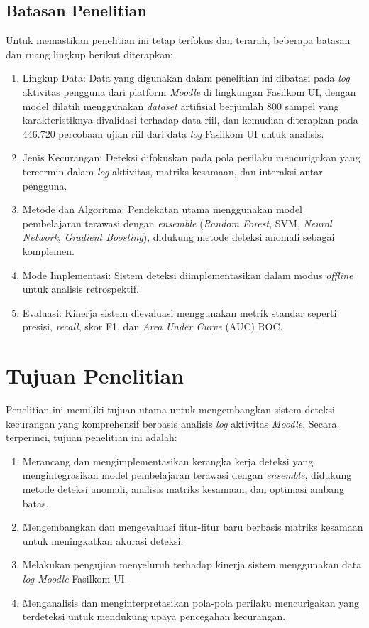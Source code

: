 \subsection{Batasan Penelitian}
\label{sec:batasanMasalah}
Untuk memastikan penelitian ini tetap terfokus dan terarah, beberapa batasan dan ruang lingkup berikut diterapkan:
\begin{enumerate}
    \item Lingkup Data: Data yang digunakan dalam penelitian ini dibatasi pada \textit{log} aktivitas pengguna dari platform \textit{Moodle} di lingkungan Fasilkom UI, dengan model dilatih menggunakan \textit{dataset} artifisial berjumlah 800 sampel yang karakteristiknya divalidasi terhadap data riil, dan kemudian diterapkan pada 446.720 percobaan ujian riil dari data \textit{log} Fasilkom UI untuk analisis.
    \item Jenis Kecurangan: Deteksi difokuskan pada pola perilaku mencurigakan yang tercermin dalam \textit{log} aktivitas, matriks kesamaan, dan interaksi antar pengguna.
    \item Metode dan Algoritma: Pendekatan utama menggunakan model pembelajaran terawasi dengan \textit{ensemble} (\textit{Random Forest}, SVM, \textit{Neural Network}, \textit{Gradient Boosting}), didukung metode deteksi anomali sebagai komplemen.
    \item Mode Implementasi: Sistem deteksi diimplementasikan dalam modus \textit{offline} untuk analisis retrospektif.
    \item Evaluasi: Kinerja sistem dievaluasi menggunakan metrik standar seperti presisi, \textit{recall}, skor F1, dan \textit{Area Under Curve} (AUC) ROC.
\end{enumerate}

\section{Tujuan Penelitian}
\label{sec:tujuan}
Penelitian ini memiliki tujuan utama untuk mengembangkan sistem deteksi kecurangan yang komprehensif berbasis analisis \textit{log} aktivitas \textit{Moodle}. Secara terperinci, tujuan penelitian ini adalah:
\begin{enumerate}
    \item Merancang dan mengimplementasikan kerangka kerja deteksi yang mengintegrasikan model pembelajaran terawasi dengan \textit{ensemble}, didukung metode deteksi anomali, analisis matriks kesamaan, dan optimasi ambang batas.
    \item Mengembangkan dan mengevaluasi fitur-fitur baru berbasis matriks kesamaan untuk meningkatkan akurasi deteksi.
    \item Melakukan pengujian menyeluruh terhadap kinerja sistem menggunakan data \textit{log Moodle} Fasilkom UI.
    \item Menganalisis dan menginterpretasikan pola-pola perilaku mencurigakan yang terdeteksi untuk mendukung upaya pencegahan kecurangan.
\end{enumerate}

